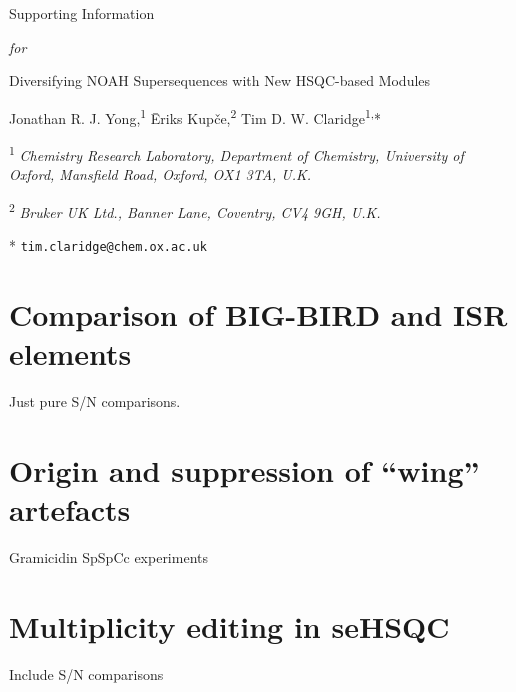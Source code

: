 \newcommand{\sectionbreak}{\clearpage}
\renewcommand\thefigure{S\arabic{figure}}
\renewcommand\thetable{S\arabic{table}}
\setcounter{page}{1}
\setcounter{figure}{0}
\setcounter{table}{0}
\hspace{0pt}
\vfill
\begin{center}
    \huge
    Supporting Information

    \textit{for}

    Diversifying NOAH Supersequences with New HSQC-based Modules

    \vspace{1cm}

    \Large Jonathan R. J. Yong,\textsuperscript{1} {\=E}riks Kup{\v{c}}e,\textsuperscript{2} Tim D. W. Claridge\textsuperscript{1,}*

    \vspace{1cm}

    \large \textsuperscript{1} \textit{Chemistry Research Laboratory, Department of Chemistry, University of Oxford, Mansfield Road, Oxford, OX1 3TA, U.K.}

    \textsuperscript{2} \textit{Bruker UK Ltd., Banner Lane, Coventry, CV4 9GH, U.K.}

    * \texttt{tim.claridge@chem.ox.ac.uk}
\end{center}
\thispagestyle{empty}
\vfill
\hspace{0pt}
\newpage

\tableofcontents

\newpage

\section{Comparison of BIG-BIRD and ISR elements}

Just pure S/N comparisons.

\section{Origin and suppression of ``wing'' artefacts}

Gramicidin SpSpCc experiments

\section{Multiplicity editing in seHSQC}

Include S/N comparisons

